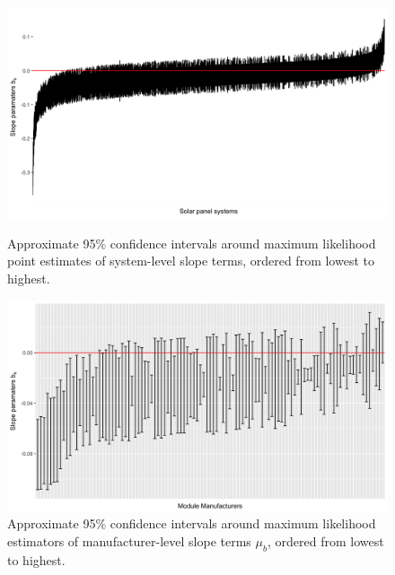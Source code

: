 \documentclass[12pt]{article}
\begin{document}
\begin{figure}
\begin{minipage}{.48\textwidth}
  \includegraphics[width=1\linewidth]{figures/sys_slope_fig.png}
  \caption{Approximate 95\% confidence intervals around maximum likelihood point estimates of system-level slope terms, ordered from lowest to highest.}
  \label{sfig:sys_slope_fig}
\end{minipage}\hfill
\begin{minipage}{.48\textwidth}
  \includegraphics[width=1\linewidth]{figures/nested_manuf_fig_final.png}
  \caption{Approximate 95\% confidence intervals around maximum likelihood estimators of manufacturer-level slope terms $\mu_b$, ordered from lowest to highest.}
  \label{sfig:nested_manuf_fig}
\end{minipage}
\end{figure}
\end{document}
